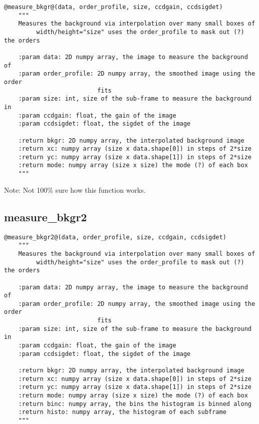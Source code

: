 \begin{lstlisting}[style=pythonstyle]
@measure_bkgr@(data, order_profile, size, ccdgain, ccdsigdet)
    """
    Measures the background via interpolation over many small boxes of
         width/height="size" uses the order_profile to mask out (?) the orders

    :param data: 2D numpy array, the image to measure the background of
    :param order_profile: 2D numpy array, the smoothed image using the order
                          fits
    :param size: int, size of the sub-frame to measure the background in
    :param ccdgain: float, the gain of the image
    :param ccdsigdet: float, the sigdet of the image

    :return bkgr: 2D numpy array, the interpolated background image
    :return xc: numpy array (size x data.shape[0]) in steps of 2*size
    :return yc: numpy array (size x data.shape[1]) in steps of 2*size
    :return mode: numpy array (size x size) the mode (?) of each box
    """
\end{lstlisting}

\noindent Note: Not 100\% sure how this function works. \\

\subsection{measure\_bkgr2}

\begin{lstlisting}[style=pythonstyle]
@measure_bkgr2@(data, order_profile, size, ccdgain, ccdsigdet)
    """
    Measures the background via interpolation over many small boxes of
         width/height="size" uses the order_profile to mask out (?) the orders

    :param data: 2D numpy array, the image to measure the background of
    :param order_profile: 2D numpy array, the smoothed image using the order
                          fits
    :param size: int, size of the sub-frame to measure the background in
    :param ccdgain: float, the gain of the image
    :param ccdsigdet: float, the sigdet of the image

    :return bkgr: 2D numpy array, the interpolated background image
    :return xc: numpy array (size x data.shape[0]) in steps of 2*size
    :return yc: numpy array (size x data.shape[1]) in steps of 2*size
    :return mode: numpy array (size x size) the mode (?) of each box
    :return binc: numpy array, the bins the histogram is binned along
    :return histo: numpy array, the histogram of each subframe
    """
\end{lstlisting}

